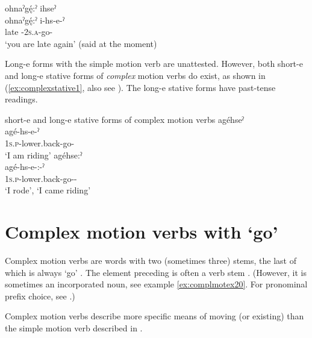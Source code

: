 \ex ohnaˀgę́:ˀ ihseˀ\\
\gll ohnaˀgę́:ˀ i-hs-e-ˀ\\
late {\prothetic}-\textsc{2s.a}-go-{\stative}\\
\glt ‘you are late again’ (said at the moment)
\z
\z

Long-e  {\stative} forms with the simple motion verb  are unattested. However, both short-e  and long-e  stative forms of \emph{complex} motion verbs do exist, as shown in (\ref{ex:complexstative1}, also see ). The long-e stative forms have past-tense readings.

\ea\label{ex:complexstative1} short-e  and long-e  stative forms of complex motion verbs
\ea\label{ex:complexstative1a} agéhseˀ\\
\gll agé-hs-e-ˀ\\
 \textsc{1s.p}-lower.back-go-{\stative} \\
\glt `I am riding'
\ex\label{ex:complexstative1b} agéhse:ˀ \\
\gll agé-hs-e-:-ˀ\\
 \textsc{1s.p}-lower.back-go-{\purposive}-{\stative} \\
\glt ‘I rode’, `I came riding'
\z
\z

\section{Complex motion verbs with  ‘go’} \label{ch:Complex motion verbs}
Complex motion verbs are words with two (sometimes three) stems, the last of which is always  ‘go’ . The element preceding  is often a verb stem . (However, it is sometimes an incorporated noun, see example \ref{ex:complmotex20}. For pronominal prefix choice, see .) 

Complex motion verbs describe more specific means of moving (or existing) than the simple motion verb described in .


